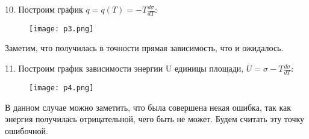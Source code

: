 10. Построим график $q = q(T) = -T\frac{d\sigma}{dT}$:

\begin{figure}[h]
  \centering
  \texttt{[image: p3.png]}
\end{figure}

Заметим, что получилась в точности прямая зависимость, что и ожидалось.

11. Построим график зависимости энергии U единицы площади, $U = \sigma - T\frac{d\sigma}{dT}$:

\begin{figure}[h]
  \centering
  \texttt{[image: p4.png]}
\end{figure}
В данном случае можно заметить, что была совершена некая ошибка, так как энергия получилась отрицательной, чего быть не может. Будем считать эту точку ошибочной.
